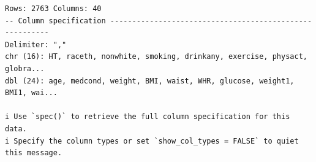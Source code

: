 \documentclass[
  letterpaper,
  DIV=11,
  numbers=noendperiod]{scrreport}
\newenvironment{Shaded}{\begin{snugshade}}{\end{snugshade}}
\newcommand{\AttributeTok}[1]{\textcolor[rgb]{0.40,0.45,0.13}{#1}}
\newcommand{\CommentTok}[1]{\textcolor[rgb]{0.37,0.37,0.37}{#1}}
\newcommand{\ConstantTok}[1]{\textcolor[rgb]{0.56,0.35,0.01}{#1}}
\newcommand{\FunctionTok}[1]{\textcolor[rgb]{0.28,0.35,0.67}{#1}}
\newcommand{\NormalTok}[1]{\textcolor[rgb]{0.00,0.23,0.31}{#1}}
\newcommand{\OtherTok}[1]{\textcolor[rgb]{0.00,0.23,0.31}{#1}}
\newcommand{\SpecialCharTok}[1]{\textcolor[rgb]{0.37,0.37,0.37}{#1}}
\begin{document}
\begin{verbatim}
Rows: 2763 Columns: 40
-- Column specification --------------------------------------------------------
Delimiter: ","
chr (16): HT, raceth, nonwhite, smoking, drinkany, exercise, physact, globra...
dbl (24): age, medcond, weight, BMI, waist, WHR, glucose, weight1, BMI1, wai...

i Use `spec()` to retrieve the full column specification for this data.
i Specify the column types or set `show_col_types = FALSE` to quiet this message.
\end{verbatim}

\begin{Shaded}
\end{Shaded}
\end{document}

